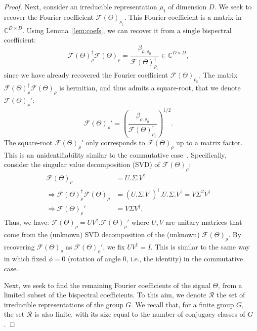 \begin{proof}
    Next, consider an irreducible representation $\rho_1$ of dimension $D$. We seek to recover the Fourier coefficient $\mathcal{F}(\Theta)_{\rho_1}$. This Fourier coefficient is a matrix in $\mathbb{C}^{D \times D}$. Using Lemma~\ref{lem:coefs}, we can recover it from a single bispectral coefficient:
    \begin{equation}
        \mathcal{F}(\Theta)_{\rho}^\dagger\mathcal{F}(\Theta)_{\rho}
        = \frac{\beta_{\rho, \rho_0}}{\mathcal{F}(\Theta)_{\rho_0}^\dagger} \in \mathbb{C}^{D \times D},
    \end{equation}
    since we have already recovered the Fourier coefficient $ \mathcal{F}(\Theta)_{\rho_0}$. The matrix $\mathcal{F}(\Theta)_{\rho}^\dagger\mathcal{F}(\Theta)_{\rho}$ is hermitian, and thus admits a square-root, that we denote $\mathcal{F}(\Theta)_{\rho}'$:
      \begin{equation}
        \mathcal{F}(\Theta)_{\rho}'
        = \left(\frac{\beta_{\rho, \rho_0}}{\mathcal{F}(\Theta)_{\rho_0}^\dagger}
        \right)^{1/2}.
    \end{equation}
    The square-root $\mathcal{F}(\Theta)_{\rho}'$ only corresponds to $\mathcal{F}(\Theta)_{\rho}$ up to a matrix factor. This is an unidentifiability similar to the commutative case~\cite{KakaralaTriple}. Specifically, consider the singular value decomposition (SVD) of $\mathcal{F}(\Theta)_{\rho}$:
    \begin{align*}
        \mathcal{F}(\Theta)_{\rho}
        &= U.\Sigma.V^\dagger\\
        \Rightarrow
         \mathcal{F}(\Theta)_{\rho}^\dagger\mathcal{F}(\Theta)_{\rho}
        &= (U.\Sigma.V^\dagger)^\dagger. U.\Sigma.V^\dagger
        = V \Sigma^2 V^\dagger\\
        \Rightarrow
        \mathcal{F}(\Theta)_{\rho}'
        &= V \Sigma V^\dagger.
    \end{align*}
    Thus, we have: $\mathcal{F}(\Theta)_{\rho} = UV^\dagger.\mathcal{F}(\Theta)_{\rho}' $ where $U, V$ are unitary matrices that come from the (unknown) SVD decomposition of the (unknown) $\mathcal{F}(\Theta)_{\rho}$. By recovering $\mathcal{F}(\Theta)_{\rho}$ as $\mathcal{F}(\Theta)_{\rho}'$, we fix $UV^\dagger=I$. This is similar to the same way in which \cite{KakaralaTriple} fixed $\phi = 0$ (rotation of angle 0, i.e., the identity) in the commutative case.

    Next, we seek to find the remaining Fourier coefficients of the signal $\Theta$, from a limited subset of the bispectral coefficients. To this aim, we denote $\mathcal{R}$ the set of irreducible representations of the group $G$. We recall that, for a finite group $G$, the set $\mathcal{R}$ is also finite, with its size equal to the number of conjugacy classes of $G$.


\end{proof}
